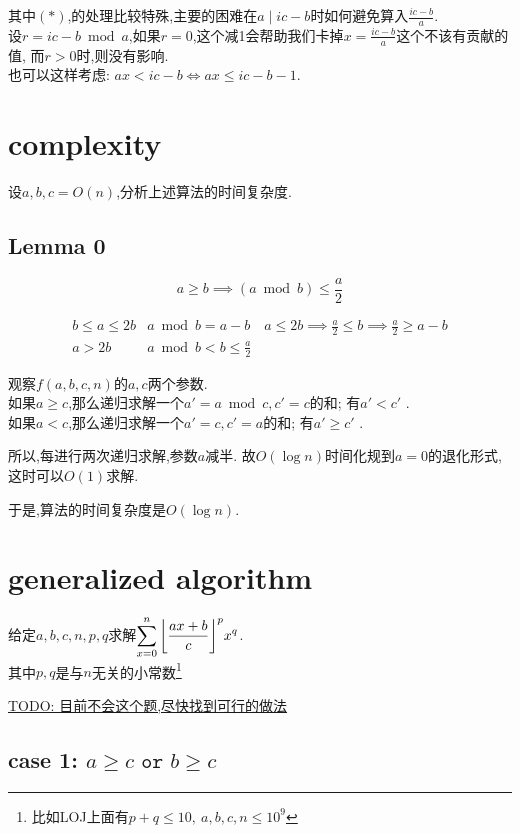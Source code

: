 \documentclass{article}
\begin{document}
其中$(\ast)$,的处理比较特殊,主要的困难在$a\mid ic-b$时如何避免算入$\frac{ic-b}{a}$.\\
设$r=ic-b\bmod a$,如果$r=0$,这个减1会帮助我们卡掉$x=\frac{ic-b}{a}$这个不该有贡献的值, 而$r>0$时,则没有影响.\\
也可以这样考虑: $ax < ic-b\iff ax \leq ic-b-1$.


\section{complexity}

设$a,b,c=O(n)$,分析上述算法的时间复杂度.

\subsection*{Lemma 0}

\[ a\geq b \implies (a\bmod b) \leq \frac{a}{2} \]

\[
\begin{array}{c|l}
	b\leq a\leq 2b & a\bmod b=a-b\quad a\leq 2b\implies \frac{a}{2}\leq b\implies \frac{a}{2}\geq a-b\\
	a > 2b & a\bmod b < b \leq \frac{a}{2}
\end{array}
\]


观察$f(a,b,c,n)$的$a,c$两个参数.\\
如果$a\geq c$,那么递归求解一个$a'=a\bmod c,c'=c$的和; 有$a' < c'$ .\\
如果$a<    c$,那么递归求解一个$a'=c,c'=a$的和; 有$a' \geq c'$ .\par
所以,每进行两次递归求解,参数$a$减半. 故$O(\log n)$时间化规到$a=0$的退化形式,这时可以$O(1)$求解.\par
于是,算法的时间复杂度是$O(\log n)$.

\section{generalized algorithm}

\noindent 给定$a,b,c,n,p,q$求解$\displaystyle \sum_{x=0}^n
{{ \left\lfloor \frac{ax+b}{c} \right\rfloor }}^{p}
x^q$.\\
其中$p,q$是与$n$无关的小常数\footnote{比如LOJ上面有$p+q\leq 10,\ a,b,c,n\leq 10^9$}


\underline{TODO: 目前不会这个题,尽快找到可行的做法}

\subsection*{case 1: $a\geq c\texttt{ or }b\geq c$}
\end{document}
